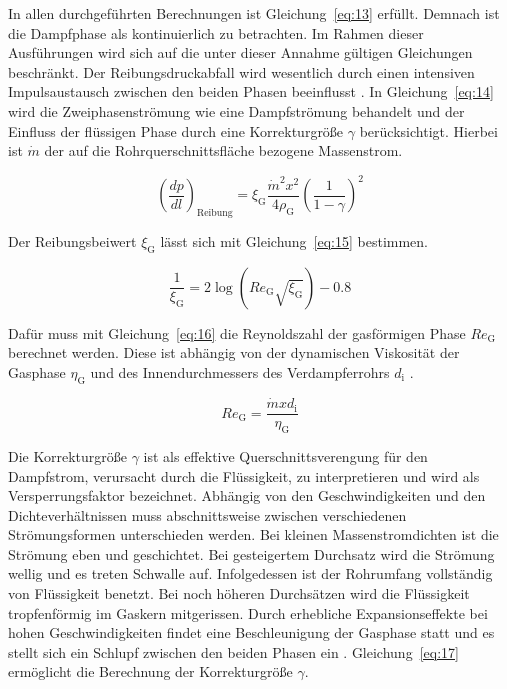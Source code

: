 In allen durchgeführten Berechnungen ist Gleichung~\ref{eq:13} erfüllt. Demnach ist die Dampfphase als kontinuierlich zu betrachten. Im Rahmen dieser Ausführungen wird sich auf die unter dieser Annahme gültigen Gleichungen beschränkt. Der Reibungsdruckabfall wird wesentlich durch einen intensiven Impulsaustausch zwischen den beiden Phasen beeinflusst \cite{Kesper.1976}. In Gleichung~\ref{eq:14} wird die Zweiphasenströmung wie eine Dampfströmung behandelt und der Einfluss der flüssigen Phase durch eine Korrekturgröße $\gamma$ berücksichtigt. Hierbei ist $\dot{m}$ der auf die Rohrquerschnittsfläche bezogene Massenstrom.

\begin{equation}
\label{eq:14}
\left( \frac{dp}{dl} \right)_{\mathrm{Reibung}} = \xi_\mathrm{G} \frac{\dot{m}^2 x^2}{4\rho_\mathrm{G}} \left(\frac{1}{1-\gamma} \right)^2
\end{equation}

Der Reibungsbeiwert $\xi_\mathrm{G}$ lässt sich mit Gleichung~\ref{eq:15} bestimmen.

\begin{equation}
\label{eq:15}
\frac{1}{\xi_\mathrm{G}} = 2\log(Re_\mathrm{G} \sqrt{\xi_\mathrm{G}})-0.8
\end{equation}

Dafür muss mit Gleichung~\ref{eq:16} die Reynoldszahl der gasförmigen Phase $Re_\mathrm{G}$ berechnet werden. Diese ist abhängig von der dynamischen Viskosität der Gasphase $\eta_\mathrm{G}$ und des Innendurchmessers des Verdampferrohrs $d_\mathrm{i}$ \cite{Awad.2012}.

\begin{equation}
\label{eq:16}
Re_\mathrm{G} = \frac{\dot{m} x d_\mathrm{i}}{\eta_\mathrm{G}}
\end{equation}

Die Korrekturgröße $\gamma$ ist als effektive Querschnittsverengung für den Dampfstrom, verursacht durch die Flüssigkeit, zu interpretieren und wird als Versperrungsfaktor bezeichnet. Abhängig von den Geschwindigkeiten und den Dichteverhältnissen muss abschnittsweise zwischen verschiedenen Strömungsformen unterschieden werden. Bei kleinen Massenstromdichten ist die Strömung eben und geschichtet. Bei gesteigertem Durchsatz wird die Strömung wellig und es treten Schwalle auf. Infolgedessen ist der Rohrumfang vollständig von Flüssigkeit benetzt. Bei noch höheren Durchsätzen wird die Flüssigkeit tropfenförmig im Gaskern mitgerissen. Durch erhebliche Expansionseffekte bei hohen Geschwindigkeiten findet eine Beschleunigung der Gasphase statt und es stellt sich ein Schlupf zwischen den beiden Phasen ein \cite{Kesper.1976}.
Gleichung~\ref{eq:17} ermöglicht die Berechnung der Korrekturgröße $\gamma$.

